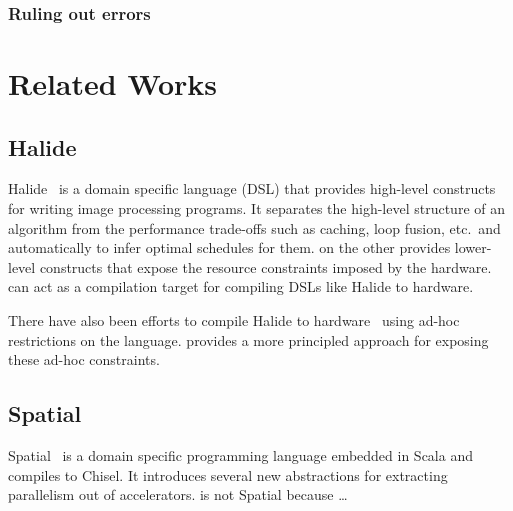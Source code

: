 \documentclass[acmsmall,review,anonymous]{acmart}\settopmatter{printfolios=true,printccs=false,printacmref=false}
\begin{document}
\subsubsection{Ruling out errors}

\section{Related Works}

\subsection{Halide}
Halide~\cite{halide} is a domain specific language (DSL) that provides high-level constructs for writing image processing
programs. It separates the high-level structure of an algorithm from the
performance trade-offs such as caching, loop fusion, etc.\ and automatically to
infer optimal schedules for them. \sys{} on the other provides lower-level constructs
that expose the resource constraints imposed by the hardware. \sys{} can act as a
compilation target for compiling DSLs like Halide to hardware.

There have also been efforts to compile Halide to hardware~\cite{halide-hls} using ad-hoc
restrictions on the language. \sys{} provides a more principled approach for
exposing these ad-hoc constraints.

\subsection{Spatial}
Spatial~\cite{spatial} is a domain specific programming language embedded in Scala
and compiles to Chisel. It introduces several new abstractions for extracting
parallelism out of accelerators. \sys{} is not Spatial because \ldots

\end{document}
